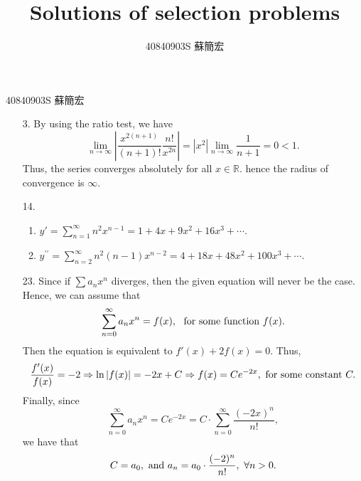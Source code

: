 \documentclass[12pt,a4paper]{article}
\title{Solutions of selection problems}
\author{40840903S 蘇簡宏}
\newcommand{\re}{\mathbb{R}}
\begin{document}
\fontsize{12pt}{20pt}\selectfont
40840903S 蘇簡宏
\begin{enumerate}
    \item[3.] By using the ratio test, we have 
    \[
        \lim_{{n}\to {\infty}} \left|\frac{x^{2(n + 1)}}{(n + 1)!} \frac{n!}{x^{2n}}\right| = \left|x^2\right|\lim_{{n}\to {\infty}} \frac{1}{n + 1} = 0 < 1. 
    \]
    Thus, the series converges absolutely for all $x \in \re$. hence the radius of convergence is $\infty$.
    \item[14.] \begin{enumerate}[label=\alph*.,noitemsep,topsep=0pt]
        \item $\displaystyle y' = \sum_{n=1}^{\infty}n ^2 x^{n - 1} = 1 + 4x + 9x ^2 + 16 x ^3 +\cdots $.
        \item $\displaystyle y^{\prime\prime} = \sum_{n=2}^{\infty}n ^2 (n - 1) x^{n - 2} = 4 + 18x + 48x ^2  + 100 x ^3 +\cdots $.                 
    \end{enumerate}
    \item[23.] Since if $\sum a_nx^n$ diverges, then the given equation will never be the case. Hence, we can assume that 
    \[
        \sum_{n=0}^{\infty} a_n x^n = f(x),\ \textup{ for some function } f(x).
    \]
    Then the equation is equivalent to $f'(x) + 2 f(x) = 0.$ Thus, 
    \[
        \dfrac{f'(x)}{f(x)} = - 2 \Rightarrow \ln |f(x)| = - 2x + C \Rightarrow f(x) = Ce^{ - 2x},\textup{\ for some constant }C.
    \]
    Finally, since 
    \[
        \sum_{n=0}^{\infty}a_n x^n =  C e^{ - 2x} = C \cdot \sum_{n=0}^{\infty}\frac{ ( - 2x)^n}{n!},
    \]
    we have that 
    \[
        C = a_0 , \textup{ and }a_n = a_0 \cdot \frac{(-2)^n}{n!},\ \forall n > 0.
    \]
\end{enumerate}
\end{document}
